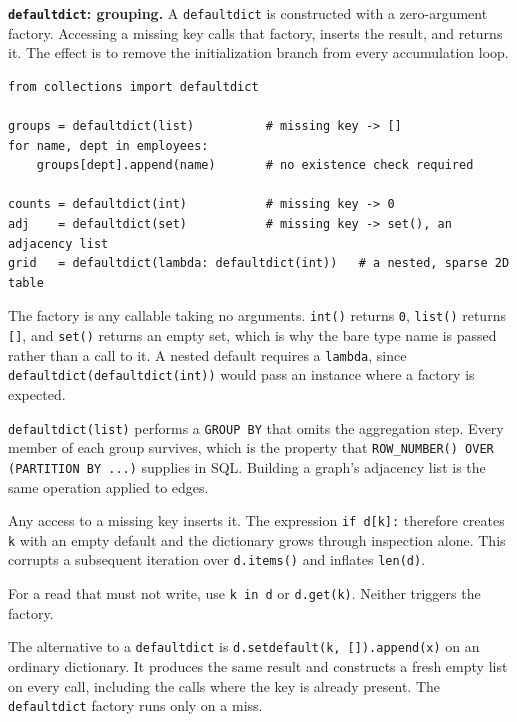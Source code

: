 \medskip

\noindent\textbf{\texttt{defaultdict}: grouping.}
A \texttt{defaultdict} is constructed with a zero-argument factory. Accessing
a missing key calls that factory, inserts the result, and returns it. The
effect is to remove the initialization branch from every accumulation loop.

\begin{lstlisting}[style=python, caption={defaultdict}]
from collections import defaultdict

groups = defaultdict(list)          # missing key -> []
for name, dept in employees:
    groups[dept].append(name)       # no existence check required

counts = defaultdict(int)           # missing key -> 0
adj    = defaultdict(set)           # missing key -> set(), an adjacency list
grid   = defaultdict(lambda: defaultdict(int))   # a nested, sparse 2D table
\end{lstlisting}

The factory is any callable taking no arguments. \texttt{int()} returns
\texttt{0}, \texttt{list()} returns \texttt{[]}, and \texttt{set()} returns an
empty set, which is why the bare type name is passed rather than a call to it.
A nested default requires a \texttt{lambda}, since
\texttt{defaultdict(defaultdict(int))} would pass an instance where a factory
is expected.

\texttt{defaultdict(list)} performs a \texttt{GROUP BY} that omits the
aggregation step. Every member of each group survives, which is the property
that \texttt{ROW\_NUMBER() OVER (PARTITION BY ...)} supplies in SQL. Building a
graph's adjacency list is the same operation applied to edges.

\begin{keybox}
Any access to a missing key inserts it. The expression \texttt{if d[k]:}
therefore creates \texttt{k} with an empty default and the dictionary grows
through inspection alone. This corrupts a subsequent iteration over
\texttt{d.items()} and inflates \texttt{len(d)}.

For a read that must not write, use \texttt{k in d} or \texttt{d.get(k)}.
Neither triggers the factory.
\end{keybox}

The alternative to a \texttt{defaultdict} is
\texttt{d.setdefault(k, []).append(x)} on an ordinary dictionary. It produces
the same result and constructs a fresh empty list on every call, including the
calls where the key is already present. The \texttt{defaultdict} factory runs
only on a miss.

